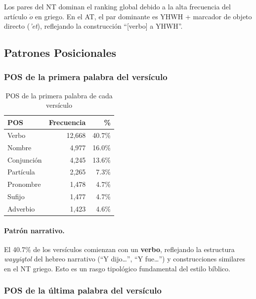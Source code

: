 \documentclass[12pt,a4paper]{article}
\begin{document}
Los pares del NT dominan el ranking global debido a la alta frecuencia del art\'iculo
$\dot{o}$ en griego. En el AT, el par dominante es YHWH + marcador de objeto directo
(\textit{'et}), reflejando la construcci\'on ``[verbo] a YHWH''.


\subsection{Patrones Posicionales}

\subsubsection{POS de la primera palabra del vers\'iculo}

\begin{table}[H]
\centering
\caption{POS de la primera palabra de cada vers\'iculo}
\label{tab:firstpos}
\begin{tabular}{lrr}
\toprule
\textbf{POS} & \textbf{Frecuencia} & \textbf{\%} \\
\midrule
Verbo          & 12,668 & 40.7\% \\
Nombre         &  4,977 & 16.0\% \\
Conjunci\'on   &  4,245 & 13.6\% \\
Part\'icula    &  2,265 &  7.3\% \\
Pronombre      &  1,478 &  4.7\% \\
Sufijo         &  1,477 &  4.7\% \\
Adverbio       &  1,423 &  4.6\% \\
\bottomrule
\end{tabular}
\end{table}

\paragraph{Patr\'on narrativo.}
El 40.7\% de los vers\'iculos comienzan con un \textbf{verbo}, reflejando la estructura
\emph{wayyiqtol} del hebreo narrativo (``Y dijo\ldots'', ``Y fue\ldots'') y construcciones
similares en el NT griego. Esto es un rasgo tipol\'ogico fundamental del estilo b\'iblico.

\subsubsection{POS de la \'ultima palabra del vers\'iculo}
\end{document}
